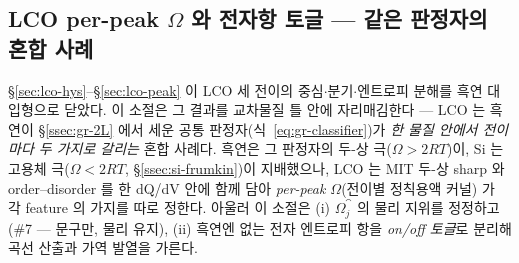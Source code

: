 \subsection{LCO per-peak $\Omega$ 와 전자항 토글 --- 같은 판정자의 혼합 사례}\label{ssec:lco-omega}
\S\ref{sec:lco-hys}--\S\ref{sec:lco-peak} 이 LCO 세 전이의 중심$\cdot$분기$\cdot$엔트로피 분해를 흑연 대입형으로
닫았다. 이 소절은 그 결과를 교차물질 틀 안에 자리매김한다 --- LCO 는 흑연이 \S\ref{ssec:gr-2L} 에서 세운 공통
판정자(식~\eqref{eq:gr-classifier})가 \emph{한 물질 안에서 전이마다 두 가지로 갈리는} 혼합 사례다. 흑연은 그
판정자의 두-상 극($\Omega>2RT$)이, Si 는 고용체 극($\Omega<2RT$, \S\ref{ssec:si-frumkin})이 지배했으나, LCO 는
MIT 두-상 sharp 와 order--disorder 를 한 dQ/dV 안에 함께 담아 \emph{per-peak $\Omega$}(전이별 정칙용액 커널)
가 각 feature 의 가지를 따로 정한다. 아울러 이 소절은 (i) $\Omega_j^\cat$ 의 물리 지위를 정정하고(\#7 ---
문구만, 물리 유지), (ii) 흑연엔 없는 전자 엔트로피 항을 \emph{on/off 토글}로 분리해 곡선 산출과 가역 발열을
가른다.

